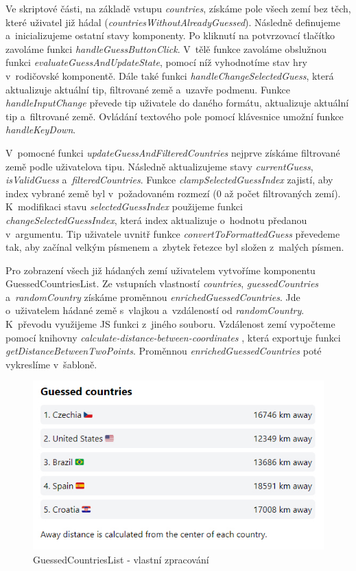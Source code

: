 Ve skriptové části, na základě vstupu \emph{countries}, získáme pole všech zemí bez těch, které uživatel již hádal (\emph{countriesWithoutAlreadyGuessed}). 
Následně definujeme a~inicializujeme ostatní stavy komponenty. Po kliknutí na potvrzovací tlačítko zavoláme funkci \emph{handleGuessButtonClick}. 
V~tělě funkce zavoláme obslužnou funkci \emph{evaluateGuessAndUpdateState}, pomocí níž vyhodnotíme stav hry v~rodičovské komponentě. 
Dále také funkci \emph{handleChangeSelectedGuess}, která aktualizuje aktuální tip, filtrované země a~uzavře podmenu. 
Funkce \emph{handleInputChange} převede tip uživatele do daného formátu, aktualizuje aktuální tip a~filtrované země. Ovládání textového pole pomocí klávesnice umožní funkce \emph{handleKeyDown}.

V~pomocné funkci \emph{updateGuessAndFilteredCountries} nejprve získáme filtrované země podle uživatelova tipu. Následně aktualizujeme stavy \emph{currentGuess}, \emph{isValidGuess} a~\emph{filteredCountries}. 
Funkce \emph{clampSelectedGuessIndex} zajistí, aby index vybrané země byl v~požadovaném rozmezí (0 až počet filtrovaných zemí). 
K~modifikaci stavu \emph{selectedGuessIndex} použijeme funkci \emph{changeSelectedGuessIndex}, která index aktualizuje o~hodnotu předanou v~argumentu. 
Tip uživatele uvnitř funkce \emph{convertToFormattedGuess} převedeme tak, aby začínal velkým písmenem a~zbytek řetezce byl složen z~malých písmen.

Pro zobrazení všech již hádaných zemí uživatelem vytvoříme komponentu GuessedCountriesList. 
Ze vstupních vlastností \emph{countries}, \emph{guessedCountries} a~\emph{randomCountry} získáme proměnnou \emph{enrichedGuessedCountries}. 
Jde o~uživatelem hádané země s~vlajkou a~vzdáleností od \emph{randomCountry}. K~převodu využijeme JS funkci z~jiného souboru. 
Vzdálenost zemí vypočteme pomocí knihovny \emph{calculate-distance-between-coordinates} \cite{distancebetweencoordinates}, která exportuje funkci \emph{getDistanceBetweenTwoPoints}. 
Proměnnou \emph{enrichedGuessedCountries} poté vykreslíme v~šabloně.

\begin{figure}[htb]
	\centering
		\includegraphics[width=.7\textwidth]{images/GuessedCountriesList.jpg}
	\caption[GuessedCountriesList]{GuessedCountriesList - vlastní zpracování}
	\label{fig:svelteguessedcountrieslist}
\end{figure}

